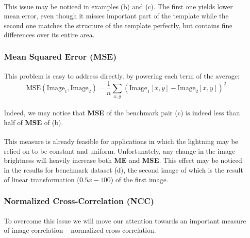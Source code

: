 \paragraph*{}
This issue may be noticed in  examples (b) and (c). The first one yields lower mean error, even though it misses important part of the template while the second one matches the structure of the template perfectly, but contains fine differences over its entire area. 

\subsubsection{Mean Squared Error (MSE)}

\paragraph*{}
This problem is easy to address directly, by powering each term of the average:
\[
	\mbox{MSE}(\mbox{Image}_1,\mbox{Image}_2) = \frac{1}{n} \sum_{x,y} (\mbox{Image}_1[x,y] - \mbox{Image}_2[x,y])^2
\]

\paragraph*{}
Indeed, we may notice that \textbf{MSE} of the benchmark pair (c) is indeed less than half of \textbf{MSE} of (b).

\paragraph*{}
This measure is already feasible for applications in which the lightning may be relied on to be constant and uniform. Unfortunately, any change in the image brightness will heavily increase both \textbf{ME} and \textbf{MSE}. This effect may be noticed in the results for benchmark dataset (d), the second image of which is the result of linear transformation ($0.5x - 100$) of the first image.

\subsubsection{Normalized Cross-Correlation (NCC)}

\paragraph*{}
To overcome this issue we will move our attention towards an important measure of image correlation -- normalized cross-correlation. 

